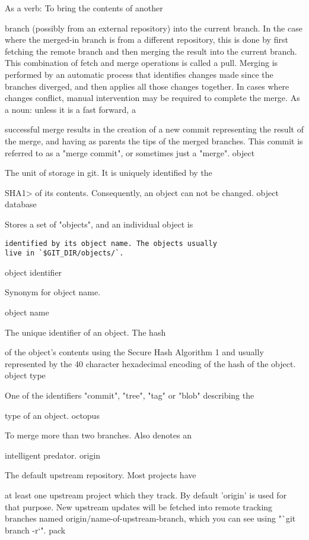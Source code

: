 As a verb: To bring the contents of another

branch (possibly from an external
repository) into the current branch.  In the
case where the merged-in branch is from a different repository,
this is done by first fetching the remote branch
and then merging the result into the current branch.  This
combination of fetch and merge operations is called a
pull.  Merging is performed by an automatic process
that identifies changes made since the branches diverged, and
then applies all those changes together.  In cases where changes
conflict, manual intervention may be required to complete the
merge.
As a noun: unless it is a fast forward, a

successful merge results in the creation of a new commit
representing the result of the merge, and having as
parents the tips of the merged branches.
This commit is referred to as a "merge commit", or sometimes just a
"merge".
object

The unit of storage in git. It is uniquely identified by the

SHA1> of its contents. Consequently, an
object can not be changed.
object database

Stores a set of "objects", and an individual object is
\scriptsize
\begin{verbatim}
identified by its object name. The objects usually
live in `$GIT_DIR/objects/`.
\end{verbatim}
\normalsize

object identifier

Synonym for object name.

object name

The unique identifier of an object. The hash

of the object's contents using the Secure Hash Algorithm
1 and usually represented by the 40 character hexadecimal encoding of
the hash of the object.
object type

One of the identifiers "commit", "tree", "tag" or "blob" describing the

type of an object.
octopus

To merge more than two branches. Also denotes an

intelligent predator.
origin

The default upstream repository. Most projects have

at least one upstream project which they track. By default
'origin' is used for that purpose. New upstream updates
will be fetched into remote tracking branches named
origin/name-of-upstream-branch, which you can see using
"`git branch -r`".
pack

